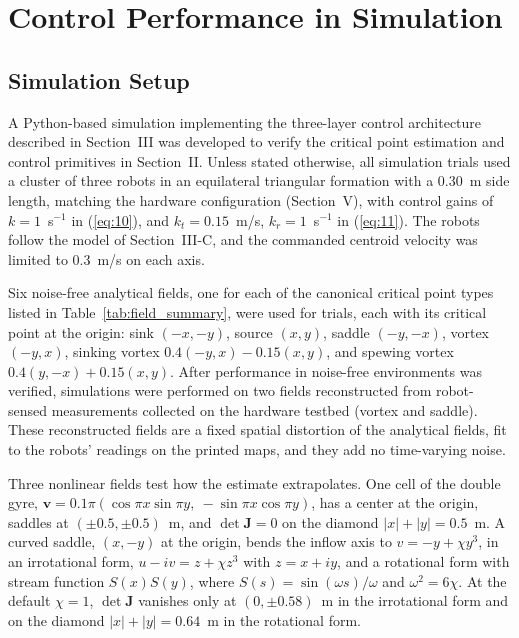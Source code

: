 \documentclass[lettersize,journal]{IEEEtran}
\newcommand{\rev}[1]{#1}
\begin{document}
\section{Control Performance in Simulation}

\subsection{Simulation Setup}
\label{sec:sim_setup}

A Python-based simulation implementing the three-layer control architecture described in Section~III was developed to verify the critical point estimation and control primitives in Section~II. Unless stated otherwise, all simulation trials used a cluster of three robots in an equilateral triangular formation with a \rev{0.30}~m side length, matching the hardware configuration (Section~V), with control gains of $k = 1$~s$^{-1}$ in (\ref{eq:10}), and $k_t = \rev{0.15}$~m/s, $k_r = \rev{1}$~s$^{-1}$ in (\ref{eq:11}). The robots follow the model of Section~III-C, and the commanded centroid velocity was limited to \rev{0.3}~m/s on each axis.

Six noise-free analytical fields, one for each of the canonical critical point types listed in Table~\ref{tab:field_summary}, were used for trials, each with its critical point at the origin: sink $(-x,-y)$, source $(x,y)$, saddle $(-y,-x)$, vortex $(-y,x)$, sinking vortex $0.4(-y,x)-0.15(x,y)$, and spewing vortex $0.4(y,-x)+0.15(x,y)$. After performance in noise-free environments was verified, simulations were performed on two fields reconstructed from robot-sensed measurements collected on the hardware testbed (vortex and saddle). These reconstructed fields are a fixed spatial distortion of the analytical fields, fit to the robots' readings on the printed maps, and they add no time-varying noise.

Three nonlinear fields test how the estimate extrapolates. One cell of the double gyre, $\mathbf{v} = 0.1\pi(\cos\pi x \sin\pi y,\allowbreak\ -\sin\pi x \cos\pi y)$, has a center at the origin, saddles at $(\pm 0.5, \pm 0.5)$~m, and $\det\mathbf{J} = 0$ on the diamond $|x| + |y| = 0.5$~m. A curved saddle, $(x, -y)$ at the origin, bends the inflow axis to $v = -y + \chi y^3$, in an irrotational form, $u - iv = z + \chi z^3$ with $z = x + iy$, and a rotational form with stream function $S(x)S(y)$, where $S(s) = \sin(\omega s)/\omega$ and $\omega^2 = 6\chi$. At the default $\chi = 1$, $\det\mathbf{J}$ vanishes only at $(0, \pm 0.58)$~m in the irrotational form and on the diamond $|x| + |y| = 0.64$~m in the rotational form.
\end{document}
